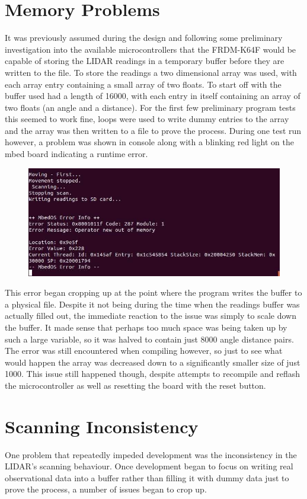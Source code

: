 	\section{Memory Problems}
	It was previously assumed during the design and following some preliminary investigation into the available microcontrollers that the FRDM-K64F would be capable of storing the LIDAR readings in a temporary buffer before they are written to the file. To store the readings a two dimensional array was used, with each array entry containing a small array of two floats. To start off with the buffer used had a length of 16000, with each entry in itself containing an array of two floats (an angle and a distance). For the first few preliminary program tests this seemed to work fine, loops were used to write dummy entries to the array and the array was then written to a file to prove the process. During one test run however, a problem was shown in console along with a blinking red light on the mbed board indicating a runtime error.
	
	\begin{figure}[ht]
		\centering
		\includegraphics[width=.8\linewidth]{SYNTHESIS/memoryerror.jpg}
		\label{fig:memoryerror}
	\end{figure}
	
	This error began cropping up at the point where the program writes the buffer to a physical file. Despite it not being during the time when the readings buffer was actually filled out, the immediate reaction to the issue was simply to scale down the buffer. It made sense that perhaps too much space was being taken up by such a large variable, so it was halved to contain just 8000 angle distance pairs. The error was still encountered when compiling however, so just to see what would happen the array was decreased down to a significantly smaller size of just 1000. This issue still happened though, despite attempts to recompile and reflash the microcontroller as well as resetting the board with the reset button.
	
	\section{Scanning Inconsistency}
	One problem that repeatedly impeded development was the inconsistency in the LIDAR's scanning behaviour. Once development began to focus on writing real observational data into a buffer rather than filling it with dummy data just to prove the process, a number of issues began to crop up.
	
